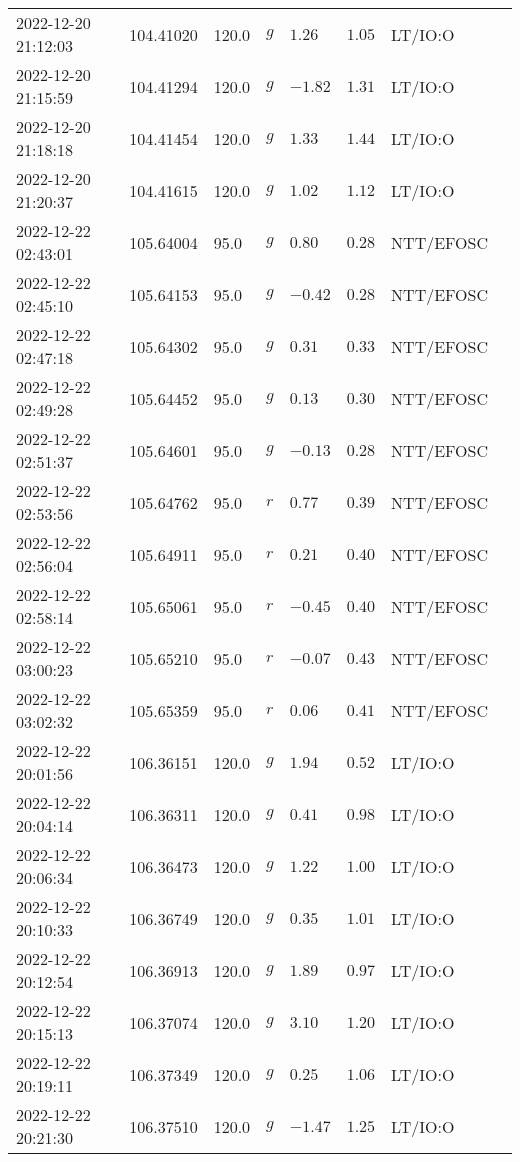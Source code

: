 \documentclass{nature_plusfigure}
\begin{document}
\begin{supplement}
\begin{center}
\begin{longtable}{llllllll}
2022-12-20 21:12:03 & 104.41020 & 120.0 & $g$ & $1.26$ & $1.05$ & LT/IO:O &  \\ 
2022-12-20 21:15:59 & 104.41294 & 120.0 & $g$ & $-1.82$ & $1.31$ & LT/IO:O &  \\ 
2022-12-20 21:18:18 & 104.41454 & 120.0 & $g$ & $1.33$ & $1.44$ & LT/IO:O &  \\ 
2022-12-20 21:20:37 & 104.41615 & 120.0 & $g$ & $1.02$ & $1.12$ & LT/IO:O &  \\ 
2022-12-22 02:43:01 & 105.64004 & 95.0 & $g$ & $0.80$ & $0.28$ & NTT/EFOSC &  \\ 
2022-12-22 02:45:10 & 105.64153 & 95.0 & $g$ & $-0.42$ & $0.28$ & NTT/EFOSC &  \\ 
2022-12-22 02:47:18 & 105.64302 & 95.0 & $g$ & $0.31$ & $0.33$ & NTT/EFOSC &  \\ 
2022-12-22 02:49:28 & 105.64452 & 95.0 & $g$ & $0.13$ & $0.30$ & NTT/EFOSC &  \\ 
2022-12-22 02:51:37 & 105.64601 & 95.0 & $g$ & $-0.13$ & $0.28$ & NTT/EFOSC &  \\ 
2022-12-22 02:53:56 & 105.64762 & 95.0 & $r$ & $0.77$ & $0.39$ & NTT/EFOSC &  \\ 
2022-12-22 02:56:04 & 105.64911 & 95.0 & $r$ & $0.21$ & $0.40$ & NTT/EFOSC &  \\ 
2022-12-22 02:58:14 & 105.65061 & 95.0 & $r$ & $-0.45$ & $0.40$ & NTT/EFOSC &  \\ 
2022-12-22 03:00:23 & 105.65210 & 95.0 & $r$ & $-0.07$ & $0.43$ & NTT/EFOSC &  \\ 
2022-12-22 03:02:32 & 105.65359 & 95.0 & $r$ & $0.06$ & $0.41$ & NTT/EFOSC &  \\ 
2022-12-22 20:01:56 & 106.36151 & 120.0 & $g$ & $1.94$ & $0.52$ & LT/IO:O &  \\ 
2022-12-22 20:04:14 & 106.36311 & 120.0 & $g$ & $0.41$ & $0.98$ & LT/IO:O &  \\ 
2022-12-22 20:06:34 & 106.36473 & 120.0 & $g$ & $1.22$ & $1.00$ & LT/IO:O &  \\ 
2022-12-22 20:10:33 & 106.36749 & 120.0 & $g$ & $0.35$ & $1.01$ & LT/IO:O &  \\ 
2022-12-22 20:12:54 & 106.36913 & 120.0 & $g$ & $1.89$ & $0.97$ & LT/IO:O &  \\ 
2022-12-22 20:15:13 & 106.37074 & 120.0 & $g$ & $3.10$ & $1.20$ & LT/IO:O &  \\ 
2022-12-22 20:19:11 & 106.37349 & 120.0 & $g$ & $0.25$ & $1.06$ & LT/IO:O &  \\ 
2022-12-22 20:21:30 & 106.37510 & 120.0 & $g$ & $-1.47$ & $1.25$ & LT/IO:O &  \\ 

\end{longtable}
\end{center}
\end{supplement}
\end{document}
